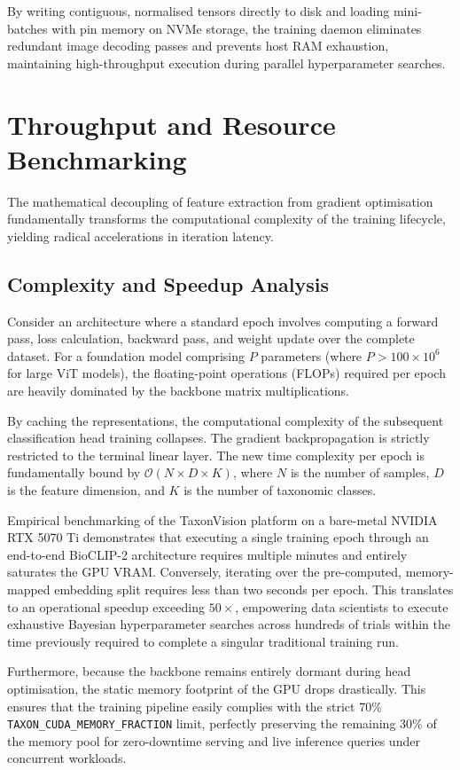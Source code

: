 By writing contiguous, normalised tensors directly to disk and loading mini-batches with pin memory on NVMe storage, the training daemon eliminates redundant image decoding passes and prevents host RAM exhaustion, maintaining high-throughput execution during parallel hyperparameter searches.

\section{Throughput and Resource Benchmarking}
\label{sec:throughput_and_resource_benchmarking}

The mathematical decoupling of feature extraction from gradient optimisation fundamentally transforms the computational complexity of the training lifecycle, yielding radical accelerations in iteration latency.

\subsection{Complexity and Speedup Analysis}

Consider an architecture where a standard epoch involves computing a forward pass, loss calculation, backward pass, and weight update over the complete dataset. For a foundation model comprising $P$ parameters (where $P > 100 \times 10^6$ for large ViT models), the floating-point operations (FLOPs) required per epoch are heavily dominated by the backbone matrix multiplications.

By caching the representations, the computational complexity of the subsequent classification head training collapses. The gradient backpropagation is strictly restricted to the terminal linear layer. The new time complexity per epoch is fundamentally bound by $\mathcal{O}(N \times D \times K)$, where $N$ is the number of samples, $D$ is the feature dimension, and $K$ is the number of taxonomic classes.

Empirical benchmarking of the TaxonVision platform on a bare-metal NVIDIA RTX 5070 Ti demonstrates that executing a single training epoch through an end-to-end BioCLIP-2 architecture requires multiple minutes and entirely saturates the GPU VRAM. Conversely, iterating over the pre-computed, memory-mapped embedding split requires less than two seconds per epoch. This translates to an operational speedup exceeding $50\times$, empowering data scientists to execute exhaustive Bayesian hyperparameter searches across hundreds of trials within the time previously required to complete a singular traditional training run.

Furthermore, because the backbone remains entirely dormant during head optimisation, the static memory footprint of the GPU drops drastically. This ensures that the training pipeline easily complies with the strict 70\% \texttt{TAXON\_CUDA\_MEMORY\_FRACTION} limit, perfectly preserving the remaining 30\% of the memory pool for zero-downtime serving and live inference queries under concurrent workloads.
